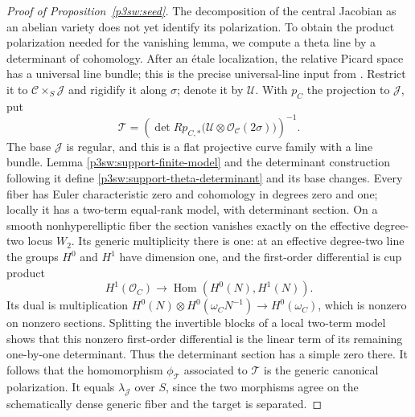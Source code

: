\documentclass[11pt]{article}
\numberwithin{equation}{section}
\begin{document}
\begin{proof}[Proof of Proposition~\ref{p3sw:seed}]
The decomposition of the central Jacobian as an abelian variety does
not yet identify its polarization.  To obtain the product polarization
needed for the vanishing lemma, we compute a theta line by a determinant
of cohomology.  After an \'etale localization, the relative Picard space
has a universal line bundle;
this is the precise universal-line input from
\cite[Section 2.1, last paragraph]{P3SWCoelhoPacini}.
Restrict it to \(\mathcal C\times_S\mathcal J\) and rigidify it along
\(\sigma\); denote it by \(\mathcal U\).  With \(p_C\) the projection
to \(\mathcal J\), put
\begin{equation}
 \mathcal T=
 \left(\det Rp_{C,*}\bigl(\mathcal U\otimes
                 \mathcal O_{\mathcal C}(2\sigma)\bigr)\right)^{-1}.
 \label{p3sw:support-theta-determinant}
\end{equation}
The base \(\mathcal J\) is regular, and this is a flat projective
curve family with a line bundle.  Lemma
\ref{p3sw:support-finite-model} and the determinant construction
following it define \eqref{p3sw:support-theta-determinant} and its base changes.  Every fiber has
Euler characteristic zero and cohomology in degrees zero and one;
locally it has a two-term equal-rank model, with determinant section.
On a smooth nonhyperelliptic fiber the section vanishes exactly on
the effective degree-two locus \(W_2\).  Its generic multiplicity
there is one: at an effective degree-two line the groups \(H^0\)
and \(H^1\) have dimension one, and the first-order differential is
cup product
\[
 H^1(\mathcal O_C)\longrightarrow
 \operatorname{Hom}(H^0(N),H^1(N)).
\]
Its dual is multiplication
\(H^0(N)\otimes H^0(\omega_C N^{-1})\to H^0(\omega_C)\),
which is nonzero on nonzero sections.  Splitting the invertible
blocks of a local two-term model shows that this nonzero first-order
differential is the linear term of its remaining one-by-one
determinant.  Thus the determinant section has a simple zero there.
It follows that the homomorphism \(\phi_{\mathcal T}\) associated to
\(\mathcal T\) is the generic canonical polarization.  It equals
\(\lambda_{\mathcal J}\) over \(S\), since the two morphisms agree
on the schematically dense generic fiber and the target is separated.


\end{proof}
\end{document}
